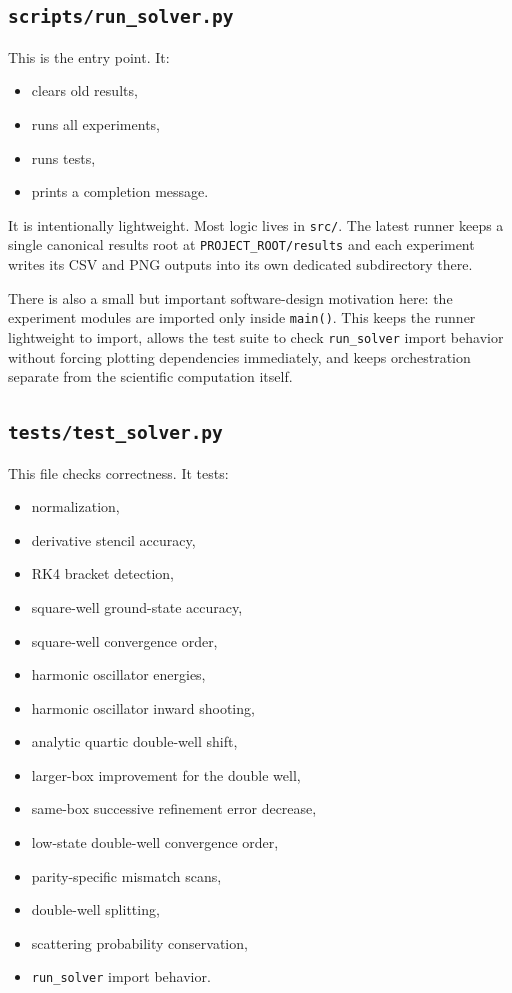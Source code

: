 \documentclass[11pt]{article}
\begin{document}
    \subsection{\texttt{scripts/run\_solver.py}}

    This is the entry point. It:
    \begin{itemize}
        \item clears old results,
        \item runs all experiments,
        \item runs tests,
        \item prints a completion message.
    \end{itemize}

    It is intentionally lightweight. Most logic lives in \texttt{src/}. The latest runner keeps a single canonical results root at \texttt{PROJECT\_ROOT/results} and each experiment writes its CSV and PNG outputs into its own dedicated subdirectory there.

    There is also a small but important software-design motivation here: the experiment modules are imported only inside \texttt{main()}. This keeps the runner lightweight to import, allows the test suite to check \texttt{run\_solver} import behavior without forcing plotting dependencies immediately, and keeps orchestration separate from the scientific computation itself.

    \subsection{\texttt{tests/test\_solver.py}}

    This file checks correctness. It tests:
    \begin{itemize}
        \item normalization,
        \item derivative stencil accuracy,
        \item RK4 bracket detection,
        \item square-well ground-state accuracy,
        \item square-well convergence order,
        \item harmonic oscillator energies,
        \item harmonic oscillator inward shooting,
        \item analytic quartic double-well shift,
        \item larger-box improvement for the double well,
        \item same-box successive refinement error decrease,
        \item low-state double-well convergence order,
        \item parity-specific mismatch scans,
        \item double-well splitting,
        \item scattering probability conservation,
        \item \texttt{run\_solver} import behavior.
    \end{itemize}
\end{document}
